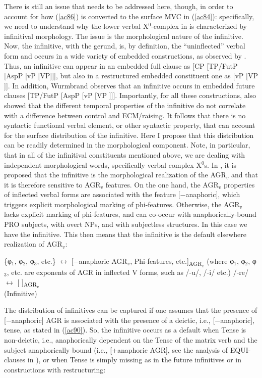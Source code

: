 \documentclass[output=paper]{langscibook}
\begin{document}
There is still an issue that needs to be addressed here, though, in order to account for how (\ref{ac86}) is converted to the surface MVC in (\ref{ac84}): specifically, we need to understand why the lower verbal X$^0$-complex in  is characterized by infinitival morphology. The issue is the morphological nature of the infinitive. Now, the infinitive, with the gerund, is, by definition, the “uninflected” verbal form and occurs in a wide variety of embedded constructions, as observed by \citet{wurmbrand2014a}.  Thus, an infinitive can appear in an embedded full clause as [CP [TP/FutP [AspP [vP [VP]]], but also in a restructured embedded constituent one as [vP [VP ]].  In addition, Wurmbrand observes that an infinitive occurs in embedded future clauses  [TP/FutP [AspP [vP [VP ]]]. Importantly, for all these constructions, \citet{wurmbrand2014a} also showed that the different temporal properties of the infinitive do not correlate with a difference between control and ECM/raising. It follows that there is no syntactic functional verbal element, or other syntactic property, that can account for the surface distribution of the infinitive. Here I propose that this distribution can be readily determined in the morphological component. Note, in particular, that in all of the infinitival constituents mentioned above, we are dealing with independent morphological words, specifically verbal complex X$^0$s. In \cite{calabrese1993a}, it is proposed that the infinitive is the morphological realization of the  AGR$_v$ and that it is therefore sensitive to  AGR$_v$ features. On the one hand, the  AGR$_v$ properties of inflected verbal forms are associated with the feature [−anaphoric], which triggers explicit morphological marking of phi-features.  Otherwise, the  AGR$_v$ lacks explicit marking of phi-features, and can co-occur with anaphorically-bound PRO subjects, with overt NPs, and with subjectless structures. In this case we have the infinitive. This then means that the infinitive is the default elsewhere realization of AGR$_v$:

\ea\label{ac89}
    \ea \label{ac89a}\{φ$_1$, φ$_2$, φ$_3$, etc.\} $\longleftrightarrow$ [−anaphoric  AGR$_v$, Phi-features, etc.]\textsubscript{AGR$_v$}
       (where φ$_1$, φ$_2$, φ$_3$, etc. are exponents of AGR in inflected V forms, such as /-u/, /-i/ etc.)
    \ex \label{ac89b}/-re/ $\longleftrightarrow$  [   ]\textsubscript{AGR$_v$}\\(Infinitive)
    \z
\z

The distribution of infinitives can be captured if one assumes that the presence of [−anaphoric] AGR is associated with the presence of a deictic, i.e., [−anaphoric], tense, as stated in (\ref{ac90}). So, the infinitive occurs as a default when Tense is non-deictic, i.e., anaphorically dependent on the Tense of the matrix verb and the subject anaphorically bound (i.e., [+anaphoric AGR], see the analysis of EQUI-clauses in \cite{calabrese1993a}), or when Tense is simply missing as in the future infinitives or in constructions with restructuring:
\end{document}
